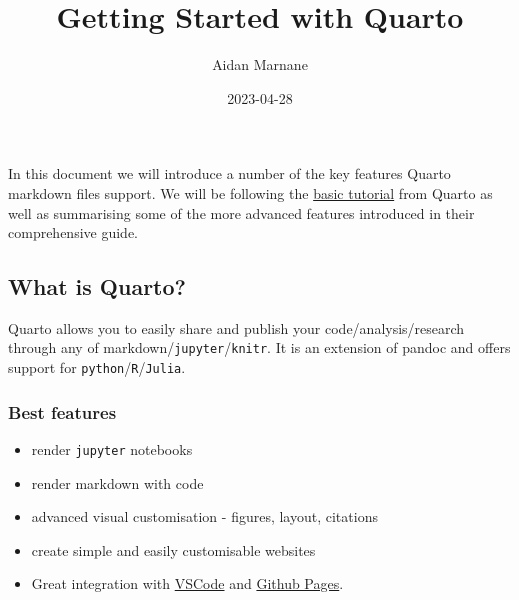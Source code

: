 \documentclass[
  letterpaper,
  DIV=11,
  numbers=noendperiod,
  oneside]{scrartcl}
\title{Getting Started with Quarto}
\author{Aidan Marnane}
\date{2023-04-28}
\providecommand{\tightlist}{%
  \setlength{\itemsep}{0pt}\setlength{\parskip}{0pt}}\usepackage{longtable,booktabs,array}
\renewcommand*\contentsname{Table of contents}
\newcommand\contentsname{Table of contents}
\begin{document}
\maketitle
\ifdefined\Shaded\renewenvironment{Shaded}{\begin{tcolorbox}[boxrule=0pt, breakable, interior hidden, borderline west={3pt}{0pt}{shadecolor}, sharp corners, frame hidden, enhanced]}{\end{tcolorbox}}\fi

\renewcommand*\contentsname{Table of contents}
{
\hypersetup{linkcolor=}
\setcounter{tocdepth}{3}
\tableofcontents
}
In this document we will introduce a number of the key features Quarto
markdown files support. We will be following the
\href{https://quarto.org/docs/get-started/computations/vscode.html}{basic
tutorial} from Quarto as well as summarising some of the more advanced
features introduced in their comprehensive guide. 

\hypertarget{what-is-quarto}{%
\subsection{What is Quarto?}\label{what-is-quarto}}

Quarto allows you to easily share and publish your
code/analysis/research through any of
markdown/\texttt{jupyter}/\texttt{knitr}. It is an extension of pandoc
and offers support for \texttt{python}/\texttt{R}/\texttt{Julia}.

\hypertarget{best-features}{%
\subsubsection{Best features}\label{best-features}}

\begin{itemize}
\tightlist
\item
  render \texttt{jupyter} notebooks
\item
  render markdown with code
\item
  advanced visual customisation - figures, layout, citations
\item
  create simple and easily customisable websites
\item
  Great integration with \href{https://code.visualstudio.com/}{VSCode}
  and \href{https://pages.github.com/}{Github Pages}.
\end{itemize}
\end{document}
